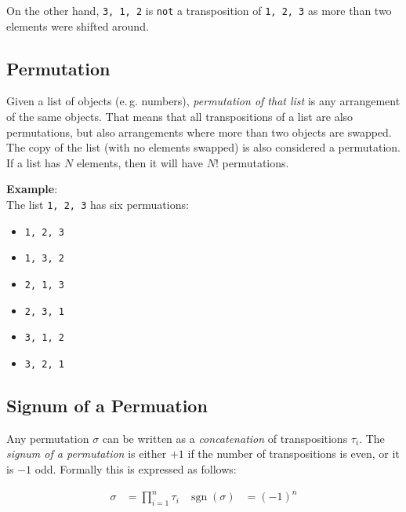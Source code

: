 \documentclass[
	english,
	fontsize=10pt,
	parskip=half,
	titlepage=true,
	DIV=12
]{scrartcl}
\newcommand*{\eg}{e.\,g.\xspace}
\DeclareMathOperator{\sgn}{sgn}
\begin{document}
On the other hand, \texttt{3, 1, 2} is \texttt{not} a transposition of \texttt{1, 2, 3} as more than two elements were shifted around.

\subsection{Permutation}
Given a list of objects (\eg numbers), \emph{permutation of that list} is any arrangement of the same objects. That means that all transpositions of a list are also permutations, but also arrangements where more than two objects are swapped. The copy of the list (with no elements swapped) is also considered a permutation. If a list has $N$ elements, then it will have $N!$ permutations.

\textbf{Example}:\\
The list \texttt{1, 2, 3} has six permuations:

\begin{minipage}{.25\linewidth}
	\begin{itemize}
	\item \texttt{1, 2, 3}
	\item \texttt{1, 3, 2}
	\end{itemize}
\end{minipage}
%
\begin{minipage}{.25\linewidth}
	\begin{itemize}
	\item \texttt{2, 1, 3}
	\item \texttt{2, 3, 1}
	\end{itemize}
\end{minipage}
%
\begin{minipage}{.25\linewidth}
	\begin{itemize}
	\item \texttt{3, 1, 2}
	\item \texttt{3, 2, 1}
	\end{itemize}
\end{minipage}

\subsection{Signum of a Permuation}
Any permutation $\sigma$ can be written as a \emph{concatenation} of transpositions $\tau_i$. The \emph{signum of a permutation} is either $+1$ if the number of transpositions is even, or it is $-1$ odd. Formally this is expressed as follows:

\begin{align*}
	\sigma &= \prod_{i=1}^n \tau_i
&
	\sgn(\sigma) &= (-1)^n
\end{align*}
\end{document}
